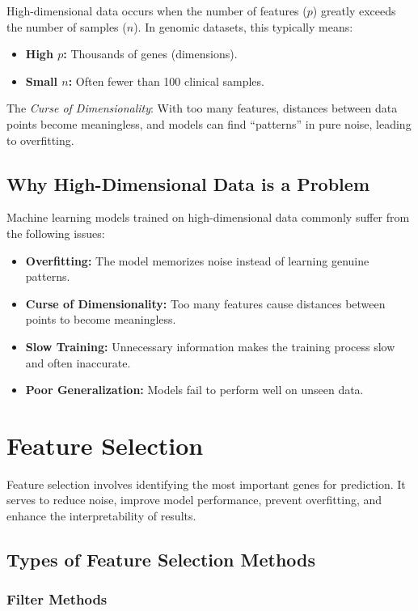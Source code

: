 High-dimensional data occurs when the number of features ($p$) greatly exceeds the number of samples ($n$). In genomic datasets, this typically means:
\begin{itemize}
    \item \textbf{High $p$:} Thousands of genes (dimensions).
    \item \textbf{Small $n$:} Often fewer than 100 clinical samples.
\end{itemize}

The \textit{Curse of Dimensionality}: With too many features, distances between data points become meaningless, and models can find ``patterns'' in pure noise, leading to overfitting.

\subsection{Why High-Dimensional Data is a Problem}

Machine learning models trained on high-dimensional data commonly suffer from the following issues:
\begin{itemize}
    \item \textbf{Overfitting:} The model memorizes noise instead of learning genuine patterns.
    \item \textbf{Curse of Dimensionality:} Too many features cause distances between points to become meaningless.
    \item \textbf{Slow Training:} Unnecessary information makes the training process slow and often inaccurate.
    \item \textbf{Poor Generalization:} Models fail to perform well on unseen data.
\end{itemize}

\section{Feature Selection}

Feature selection involves identifying the most important genes for prediction. It serves to reduce noise, improve model performance, prevent overfitting, and enhance the interpretability of results.

\subsection{Types of Feature Selection Methods}

\subsubsection{Filter Methods}

